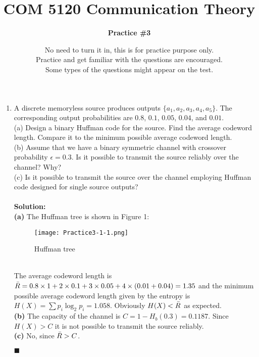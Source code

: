 \documentclass[a4paper,12pt]{article}
\title{\textbf{COM 5120 Communication Theory}}
\author{\textbf{Practice \#3}}
\date{No need to turn it in, this is for practice purpose only.  \\
Practice and get familiar with the questions are encouraged. \\ 
Some types of the questions might appear on the test. \\}
\begin{document}
    \maketitle
    \begin{enumerate}
        \item 
            A discrete memoryless source produces outputs $\{a_1, a_2, a_3, a_4, a_5 \}$. The corresponding output probabilities are $0.8$, $0.1$, $0.05$, $0.04$, and $0.01$. \\
            (a) Design a binary Huffman code for the source. Find the average codeword length. Compare it to the minimum possible average codeword length. \\
            (b) Assume that we have a binary symmetric channel with crossover probability $\epsilon = 0.3$. Is it possible to transmit the source reliably over the channel? Why? \\
            (c) Is it possible to transmit the source over the channel employing Huffman code designed for single source outputs? \\ \\
            \textbf{Solution:} \\
            \textbf{(a)} The Huffman tree is shown in Figure 1: \\ 
            \begin{figure}[h]
            	\centering
            	\texttt{[image: Practice3-1-1.png]}
            	\caption{Huffman tree}
            \end{figure} \\
            The average codeword length is $\Bar{R} = 0.8 \times 1 + 2 \times 0.1+ 3 \times 0.05 + 4 \times (0.01 + 0.04) = 1.35$ and the minimum possible average codeword length given by the entropy is $H(X) = \sum p_i \log_2 p_i = 1.058$. Obviously $H(X) < \Bar{R}$ as expected. \\ 
            \textbf{(b)} The capacity of the channel is $C = 1 - H_b(0.3) = 0.1187$. Since $H(X) > C$ it is not possible to transmit the source reliably. \\
            \textbf{(c)} No, since $\Bar{R} > C$.
            \begin{flushright}
                $\blacksquare$

\end{flushright}
\end{enumerate}
\end{document}
